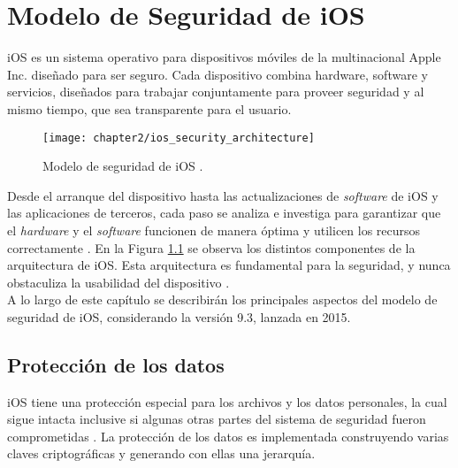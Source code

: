 \chapter{Modelo de Seguridad de iOS}
iOS es un sistema operativo para dispositivos móviles de la multinacional Apple Inc. diseñado para ser
seguro. Cada dispositivo combina hardware, software y servicios, diseñados para trabajar
conjuntamente para proveer seguridad y al mismo tiempo, que sea transparente para el
usuario.\\
\begin{figure}[htbp]
    \centering
    \texttt{[image: chapter2/ios\_security\_architecture]}
    \caption{Modelo de seguridad de iOS \cite{asg}.} 
    \label{fig:ch02:security-architecture}
\end{figure}

Desde el arranque del dispositivo hasta las actualizaciones de \emph{software} de iOS y las aplicaciones de terceros, cada paso se analiza e investiga para garantizar que el \emph{hardware} y el \emph{software} funcionen de manera óptima y utilicen los recursos correctamente \cite{asg}. En la Figura \ref{fig:ch02:security-architecture} se observa los distintos componentes de la arquitectura de iOS. Esta arquitectura es fundamental para la seguridad, y nunca obstaculiza la usabilidad del dispositivo \cite{asg}.\\

A lo largo de este capítulo se describirán los principales aspectos del modelo de seguridad de iOS, considerando la versión 9.3, lanzada en 2015.
\section{Protección de los datos} \label{fig:ch02:data-protection}
iOS tiene una protección especial para los archivos y los datos personales, la cual sigue intacta inclusive si algunas otras partes del sistema de seguridad fueron comprometidas \cite{asg}. La protección de los datos es implementada construyendo varias claves criptográficas y generando con ellas una jerarquía.\\

